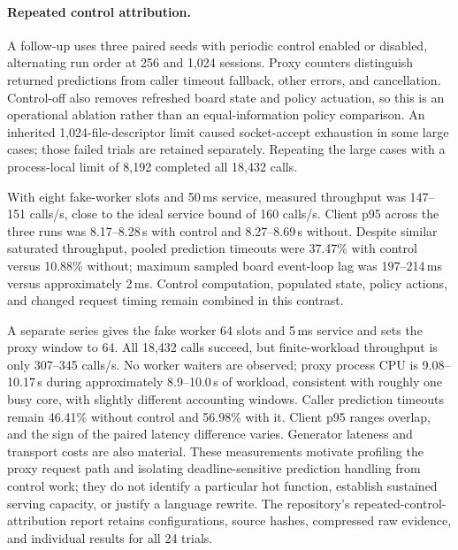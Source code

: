 \paragraph{Repeated control attribution.}
A follow-up uses three paired seeds with periodic control enabled or disabled,
alternating run order at 256 and 1,024 sessions. Proxy counters distinguish
returned predictions from caller timeout fallback, other errors, and cancellation.
Control-off also removes refreshed board state and policy actuation, so this is
an operational ablation rather than an equal-information policy comparison.
An inherited 1,024-file-descriptor limit caused socket-accept exhaustion in some
large cases; those failed trials are retained separately. Repeating the large
cases with a process-local limit of 8,192 completed all 18,432 calls.

With eight fake-worker slots and 50\,ms service, measured throughput was
147--151 calls/s, close to the ideal service bound of 160 calls/s.
Client p95 across the three runs was 8.17--8.28\,s with control and
8.27--8.69\,s without. Despite similar saturated throughput, pooled prediction
timeouts were 37.47\% with control versus 10.88\% without; maximum sampled board
event-loop lag was 197--214\,ms versus approximately 2\,ms.
Control computation, populated state, policy actions, and changed request timing
remain combined in this contrast.

A separate series gives the fake worker 64 slots and 5\,ms service and sets the
proxy window to 64. All 18,432 calls succeed, but finite-workload throughput is
only 307--345 calls/s. No worker waiters are observed; proxy process CPU is
9.08--10.17\,s during approximately 8.9--10.0\,s of workload, consistent with
roughly one busy core, with slightly different accounting windows.
Caller prediction timeouts remain 46.41\% without control and 56.98\% with it.
Client p95 ranges overlap, and the sign of the paired latency difference varies.
Generator lateness and transport costs are also material. These measurements
motivate profiling the proxy request path and isolating deadline-sensitive
prediction handling from control work; they do not identify a particular hot
function, establish sustained serving capacity, or justify a language rewrite.
The repository's repeated-control-attribution report retains configurations,
source hashes, compressed raw evidence, and individual results for all 24 trials.

